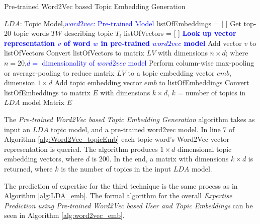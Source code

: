            \begin{algorithm}
            \caption{Pre-trained Word2Vec based Topic Embedding Generation}
            \label{alg:Word2Vec_topicEmb}
            \begin{algorithmic}[1]
                \REQUIRE $LDA$: Topic Model,\textcolor{blue}{$word2vec$: Pre-trained Model}
                \STATE listOfEmbeddings = [ ]
                    \STATE Get top-20 topic words $TW$ describing topic $T_i$
                    \STATE listOfVectors = [ ]
                    \STATE
                        \STATE \textbf{\textcolor{blue}{Look up vector representation $v$ of word $w$ in pre-trained $word2vec$ model}}
                        \STATE Add vector $v$ to listOfVectors
                    \ENDFOR
                    \STATE Convert listOfVectors to matrix $LV$ with dimensions $n \times d$; where $n=20$,\textcolor{blue}{$d =$  dimensionality of $word2vec$ model}
                    \STATE Perform column-wise max-pooling or average-pooling to reduce matrix $LV$ to a topic embedding vector $emb$, dimension $1 \times d$
                    \STATE Add topic embedding vector $emb$ to listOfEmbeddings
                \ENDFOR
                \STATE Convert listOfEmbeddings to matrix $E$ with dimensions $k \times d$,  $k$ = number of topics in $LDA$ model
                \RETURN Matrix $E$
            \end{algorithmic}
            \end{algorithm}
            
            The \emph{Pre-trained Word2Vec based Topic Embedding Generation} algorithm takes as input an $LDA$ topic model, and a pre-trained word2vec model. In line 7 of Algorithm \ref{alg:Word2Vec_topicEmb} each topic word's Word2Vec vector representation is queried. The algorithm produces $1 \times d$ dimensional topic embedding vectors, where $d$ is 200. In the end, a matrix with dimensions $k \times d$ is returned, where $k$ is the number of topics in the input $LDA$ model.
            
            The prediction of expertise for the third technique is the same process as in Algorithm \ref{alg:LDA_emb}. The formal algorithm for the overall \emph{Expertise Prediction using Pre-trained Word2Vec based User and Topic Embeddings} can be seen in Algorithm \ref{alg:word2vec_emb}.
        
